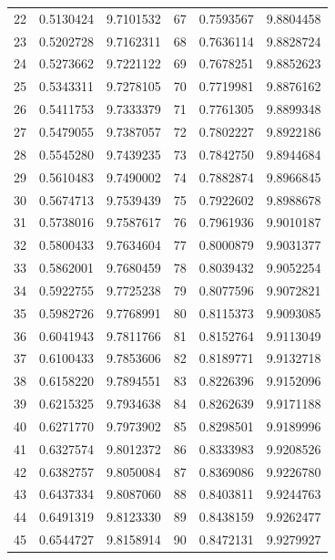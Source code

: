 \begin{center}
\begin{tabular}{||r|r|r||r|r|r||}
22 & 0.5130424 & 9.7101532 & 67 & 0.7593567 & 9.8804458 \\
23 & 0.5202728 & 9.7162311 & 68 & 0.7636114 & 9.8828724 \\
24 & 0.5273662 & 9.7221122 & 69 & 0.7678251 & 9.8852623 \\
25 & 0.5343311 & 9.7278105 & 70 & 0.7719981 & 9.8876162 \\[3pt]
26 & 0.5411753 & 9.7333379 & 71 & 0.7761305 & 9.8899348 \\
27 & 0.5479055 & 9.7387057 & 72 & 0.7802227 & 9.8922186 \\
28 & 0.5545280 & 9.7439235 & 73 & 0.7842750 & 9.8944684 \\
29 & 0.5610483 & 9.7490002 & 74 & 0.7882874 & 9.8966845 \\
30 & 0.5674713 & 9.7539439 & 75 & 0.7922602 & 9.8988678 \\[3pt]
31 & 0.5738016 & 9.7587617 & 76 & 0.7961936 & 9.9010187 \\
32 & 0.5800433 & 9.7634604 & 77 & 0.8000879 & 9.9031377 \\
33 & 0.5862001 & 9.7680459 & 78 & 0.8039432 & 9.9052254 \\
34 & 0.5922755 & 9.7725238 & 79 & 0.8077596 & 9.9072821 \\
35 & 0.5982726 & 9.7768991 & 80 & 0.8115373 & 9.9093085 \\[3pt]
36 & 0.6041943 & 9.7811766 & 81 & 0.8152764 & 9.9113049 \\
37 & 0.6100433 & 9.7853606 & 82 & 0.8189771 & 9.9132718 \\
38 & 0.6158220 & 9.7894551 & 83 & 0.8226396 & 9.9152096 \\
39 & 0.6215325 & 9.7934638 & 84 & 0.8262639 & 9.9171188 \\
40 & 0.6271770 & 9.7973902 & 85 & 0.8298501 & 9.9189996 \\[3pt]
41 & 0.6327574 & 9.8012372 & 86 & 0.8333983 & 9.9208526 \\
42 & 0.6382757 & 9.8050084 & 87 & 0.8369086 & 9.9226780 \\
43 & 0.6437334 & 9.8087060 & 88 & 0.8403811 & 9.9244763 \\
44 & 0.6491319 & 9.8123330 & 89 & 0.8438159 & 9.9262477 \\
45 & 0.6544727 & 9.8158914 & 90 & 0.8472131 & 9.9279927 \\
\hline\hline\end{tabular}\endgroup\end{center}
\clearpage
